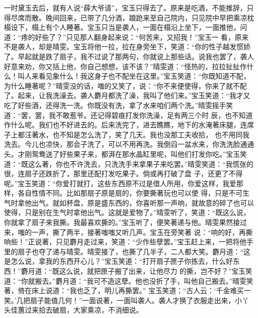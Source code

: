 \begin{parag}
    一时黛玉去后，就有人说“薛大爷请”，宝玉只得去了。原来是吃酒，不能推辞，只得尽席而散。晚间回来，已带了几分酒，踉跄来至自己院内，只见院中早把乘凉枕榻设下，榻上有个人睡著。宝玉只当是袭人，一面在榻沿上坐下，一面推他，问道：“疼的好些了？”只见那人翻身起来说：“何苦来，又招我！”宝玉一 看，原来不是袭人，却是晴雯。宝玉将他一拉，拉在身旁坐下，笑道：“你的性子越发惯娇了。早起就是跌了扇子，我不过说了那两句，你就说上那些话。说我也罢了，袭人好意来劝，你又括上他，你自己想想，该不该？”晴雯道：“怪热的，拉拉扯扯作什么！叫人来看见象什么！我这身子也不配坐在这里。”宝玉笑道：“你既知道不配，为什么睡著呢？”晴雯没的话，嗤的又笑了，说：“你不来便使得，你来了就不配了。起来，让我洗澡去。袭人麝月都洗了澡，我叫了他们来。”宝玉笑道：“我才又吃了好些酒，还得洗一洗。你既没有洗，拿了水来咱们两个洗。”晴雯摇手笑道：“罢，罢，我不敢惹爷。还记得碧痕打发你洗澡，足有两三个时 辰，也不知道作什么呢。我们也不好进去的。后来洗完了，进去瞧瞧，地下的水淹著床腿，连席子上都汪著水，也不知是怎么洗了，笑了几天。我也没那工夫收拾， 也不用同我洗去。今儿也凉快，那会子洗了，可以不用再洗。我倒舀一盆水来，你洗洗脸通通头。才刚鸳鸯送了好些果子来，都湃在那水晶缸里呢，叫他们打发你吃。”宝玉笑道：“既这么著，你也不许洗去，只洗洗手来拿果子来吃罢。”晴雯笑道：“我慌张的很，连扇子还跌折了，那里还配打发吃果子。倘或再打破了盘 子，还更了不得呢。”宝玉笑道：“你爱打就打，这些东西原不过是借人所用，你爱这样，我爱那样，各自性情不同。比如那扇子原是扇的，你要撕著玩也可以使 得，只是不可生气时拿他出气。就如杯盘，原是盛东西的，你喜听那一声响，就故意的碎了也可以使得，只是别在生气时拿他出气。这就是爱物了。”晴雯听了，笑道：“既这么说，你就拿了扇子来我撕。我最喜欢撕的。”宝玉听了，便笑著递与他。晴雯果然接过来，嗤的一声，撕了两半，接著嗤嗤又听几声。宝玉在旁笑著 说：“响的好，再撕响些！”正说著，只见麝月走过来，笑道：“少作些孽罢。”宝玉赶上来，一把将他手里的扇子也夺了递与晴雯。晴雯接了，也撕了几半子，二人都大笑。麝月道：“这是怎么说，拿我的东西开心儿？”宝玉笑道：“打开扇子匣子你拣去，什么好东西！”麝月道：“既这么说，就把匣子搬了出来，让他尽力 的撕，岂不好？”宝玉笑道：“你就搬去。”麝月道：“我可不造这孽。他也没折了手，叫他自己搬去。”晴雯笑著，倚在床上说道：“我也乏了，明儿再撕罢。” 宝玉笑道：“古人云：‘千金难买一笑。’几把扇子能值几何！”一面说著，一面叫袭人。袭人才换了衣服走出来，小丫头佳蕙过来拾去破扇，大家乘凉，不消细说。
\end{parag}


